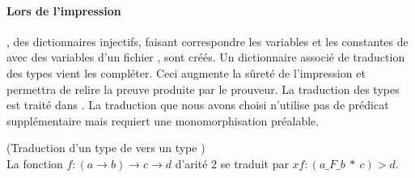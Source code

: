 \paragraph{Lors de l'impression}, des dictionnaires injectifs, faisant correspondre les variables et les constantes de \holfour avec des variables d'un fichier \tff, sont créés. Un dictionnaire associé de traduction des types vient les compléter. Ceci augmente la sûreté de l'impression et permettra de relire la preuve produite par le prouveur. La traduction des types est traité dans \cite{Blanchette12}\cite{BlanchetteBPS13}\cite{MengP08}. La traduction que nous avons choisi n'utilise pas de prédicat supplémentaire mais requiert une monomorphisation préalable. 

\begin{example} (Traduction d'un type de \holfour vers un type \tff)
\\La fonction $f: (a \rightarrow b) \rightarrow c \rightarrow d $ d'arité 2 se traduit par  $xf:(a\_F\_b\ *\ c) > d$.
\end{example}


